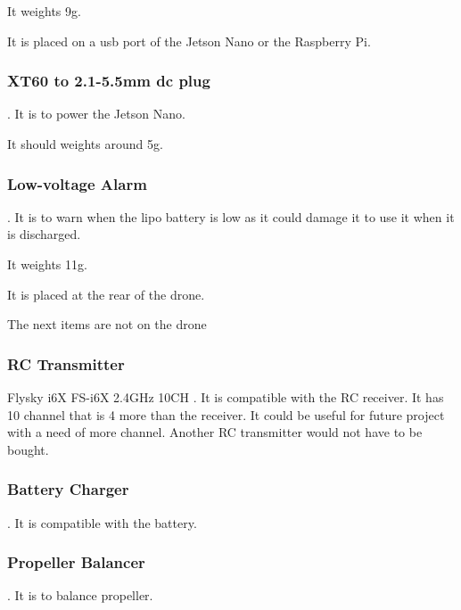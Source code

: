                 It weights 9g.
                
                It is placed on a usb port of the Jetson Nano or the Raspberry Pi.
                
            \subsubsection{XT60 to 2.1-5.5mm dc plug}
                \cite{bangood_xt60_connector}. It is to power the Jetson Nano.
                
                It should weights around 5g.
                
            \subsubsection{Low-voltage Alarm}
                \cite{bangood_battery_monitor}. It is to warn when the lipo battery is low as it could damage it to use it when it is discharged.
                
                It weights 11g.
                
                It is placed at the rear of the drone.
                
            {\color{blue}The next items are not on the drone}
                
            \subsubsection{RC Transmitter}
                Flysky i6X FS-i6X 2.4GHz 10CH \cite{bangood_transmitter}. It is compatible with the RC receiver. It has 10 channel that is 4 more than the receiver. It could be useful for future project with a need of more channel. Another RC transmitter would not have to be bought.
                
            \subsubsection{Battery Charger}
                \cite{bangood_battery_charger}. It is compatible with the battery.
                
            \subsubsection{Propeller Balancer}
                \cite{bangood_prop_balancer}. It is to balance propeller.
            
